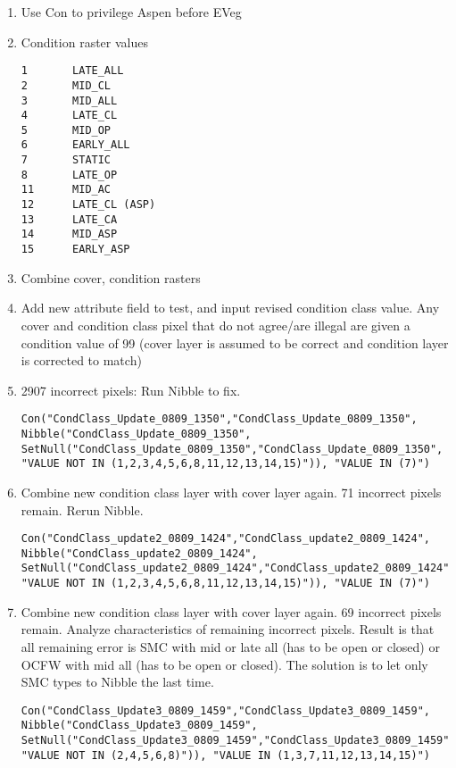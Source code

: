 \begin{enumerate}
\begin{enumerate}
        \item Use Con to privilege Aspen before EVeg
        \item Condition raster values 
        \begin{verbatim}
1       LATE_ALL
2       MID_CL
3       MID_ALL
4       LATE_CL
5       MID_OP
6       EARLY_ALL
7       STATIC
8       LATE_OP
11      MID_AC
12      LATE_CL (ASP)
13      LATE_CA 
14      MID_ASP
15      EARLY_ASP
        \end{verbatim}
        \item Combine cover, condition rasters
        \item Add new attribute field to test, and input revised condition class value. Any cover and condition class pixel that do not agree/are illegal are given a condition value of 99 (cover layer is assumed to be correct and condition layer is corrected to match)
        \item 2907 incorrect pixels: Run Nibble to fix.
        \begin{lstlisting}
Con("CondClass_Update_0809_1350","CondClass_Update_0809_1350", Nibble("CondClass_Update_0809_1350", SetNull("CondClass_Update_0809_1350","CondClass_Update_0809_1350", "VALUE NOT IN (1,2,3,4,5,6,8,11,12,13,14,15)")), "VALUE IN (7)") \end{lstlisting}
        \item Combine new condition class layer with cover layer again. 71 incorrect pixels remain. Rerun Nibble.
        \begin{lstlisting}
Con("CondClass_update2_0809_1424","CondClass_update2_0809_1424", Nibble("CondClass_update2_0809_1424", SetNull("CondClass_update2_0809_1424","CondClass_update2_0809_1424", "VALUE NOT IN (1,2,3,4,5,6,8,11,12,13,14,15)")), "VALUE IN (7)") \end{lstlisting}
        \item Combine new condition class layer with cover layer again. 69 incorrect pixels remain. Analyze characteristics of remaining incorrect pixels. Result is that all remaining error is SMC with mid or late all (has to be open or closed) or OCFW with mid all (has to be open or closed). The solution is to let only SMC types to Nibble the last time.
        \begin{lstlisting}
Con("CondClass_Update3_0809_1459","CondClass_Update3_0809_1459", Nibble("CondClass_Update3_0809_1459", SetNull("CondClass_Update3_0809_1459","CondClass_Update3_0809_1459", "VALUE NOT IN (2,4,5,6,8)")), "VALUE IN (1,3,7,11,12,13,14,15)") \end{lstlisting}

\end{enumerate}
\end{enumerate}

